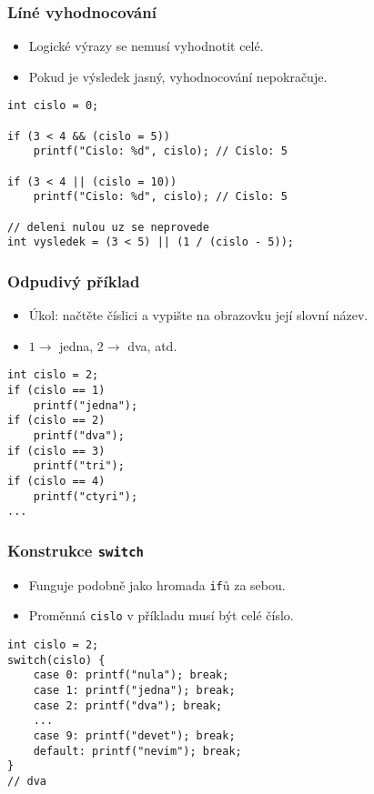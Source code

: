 \documentclass{beamer}
\newenvironment{itemizex}%
  {\large \begin{itemize}%
    \setlength{\itemsep}{8pt}%
    \setlength{\parskip}{8pt}}%
  {\end{itemize}}
\begin{document}
\begin{frame}[t,fragile]\frametitle{Líné vyhodnocování} 
  \begin{itemizex}
    \item Logické výrazy se nemusí vyhodnotit celé.
    \item Pokud je výsledek jasný, vyhodnocování nepokračuje.
  \end{itemizex}
  \begin{verbatim} 
int cislo = 0;

if (3 < 4 && (cislo = 5)) 
    printf("Cislo: %d", cislo); // Cislo: 5

if (3 < 4 || (cislo = 10))
    printf("Cislo: %d", cislo); // Cislo: 5

// deleni nulou uz se neprovede
int vysledek = (3 < 5) || (1 / (cislo - 5));
  \end{verbatim}
\end{frame}


\begin{frame}[t,fragile]\frametitle{Odpudivý příklad} 
  \begin{itemizex}
    \item Úkol: načtěte číslici a vypište na obrazovku její slovní název.
    \item $1\longrightarrow$ jedna, $2\longrightarrow$ dva, atd.
  \end{itemizex}

  \begin{verbatim} 
int cislo = 2;
if (cislo == 1)
    printf("jedna");
if (cislo == 2)
    printf("dva");
if (cislo == 3)
    printf("tri");
if (cislo == 4)
    printf("ctyri");
...
  \end{verbatim}
\end{frame}


\begin{frame}[t,fragile]\frametitle{Konstrukce \texttt{switch}} 
  \begin{itemizex}
    \item Funguje podobně jako hromada \texttt{if}ů za sebou.
    \item Proměnná \texttt{cislo} v příkladu musí být celé číslo.
  \end{itemizex}
  \begin{verbatim} 
int cislo = 2;
switch(cislo) {
    case 0: printf("nula"); break;
    case 1: printf("jedna"); break;
    case 2: printf("dva"); break;
    ...
    case 9: printf("devet"); break;
    default: printf("nevim"); break;
}
// dva
  \end{verbatim}
\end{frame}
\end{document}
